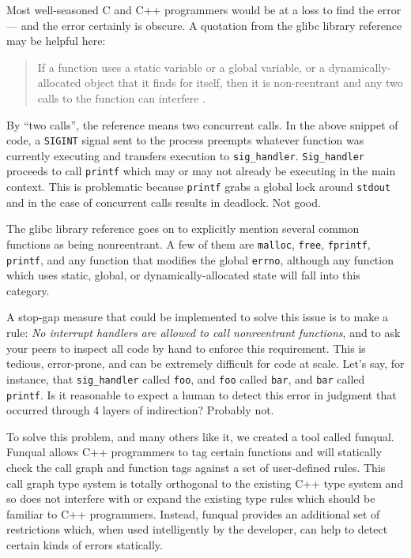 Most well-seasoned C and C++ programmers would be at a loss to find the error --- and the error certainly is obscure.  A quotation from the glibc library reference may be helpful here:

\begin{quote}
    If a function uses a static variable or a global variable, or a dynamically-allocated object that it finds for itself, then it is non-reentrant and any two calls to the function can interfere \cite{gnu-manual}.
\end{quote}

By ``two calls'', the reference means two concurrent calls.  In the above snippet of code, a \lstinline{SIGINT} signal sent to the process preempts whatever function was currently executing and transfers execution to \lstinline{sig_handler}.  \lstinline{Sig_handler} proceeds to call \lstinline{printf} which may or may not already be executing in the main context.  This is problematic because \lstinline{printf} grabs a global lock around \lstinline{stdout} and in the case of concurrent calls results in deadlock.  Not good.

The glibc library reference goes on to explicitly mention several common functions as being nonreentrant.  A few of them are \lstinline{malloc}, \lstinline{free}, \lstinline{fprintf}, \lstinline{printf}, and any function that modifies the global \lstinline{errno}, although any function which uses static, global, or dynamically-allocated state will fall into this category.  

A stop-gap measure that could be implemented to solve this issue is to make a rule: \textit{No interrupt handlers are allowed to call nonreentrant functions}, and to ask your peers to inspect all code by hand to enforce this requirement.  This is tedious, error-prone, and can be extremely difficult for code at scale.  Let's say, for instance, that \lstinline{sig_handler} called \lstinline{foo}, and \lstinline{foo} called \lstinline{bar}, and \lstinline{bar} called \lstinline{printf}.  Is it reasonable to expect a human to detect this error in judgment that occurred through 4 layers of indirection?  Probably not.

To solve this problem, and many others like it, we created a tool called funqual.  Funqual allows C++ programmers to tag certain functions and will statically check the call graph and function tags against a set of user-defined rules.  This call graph type system is totally orthogonal to the existing C++ type system and so does not interfere with or expand the existing type rules which should be familiar to C++ programmers.  Instead, funqual provides an additional set of restrictions which, when used intelligently by the developer, can help to detect certain kinds of errors statically.

